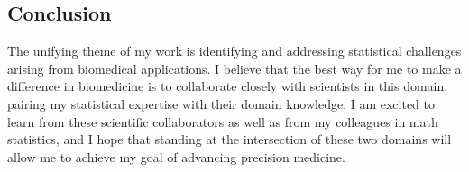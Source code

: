 \documentclass[11pt]{article}
\newcommand{\cR}{\mathcal R}
\begin{document}
\subsection*{Conclusion}

The unifying theme of my work is identifying and addressing statistical challenges arising from biomedical applications. I believe that the best way for me to make a difference in biomedicine is to collaborate closely with scientists in this domain, pairing my statistical expertise with their domain knowledge. I am excited to learn from these scientific collaborators as well as from my colleagues in math statistics, and I hope that standing at the intersection of these two domains will allow me to achieve my goal of advancing precision medicine.

%
%



\end{document}
